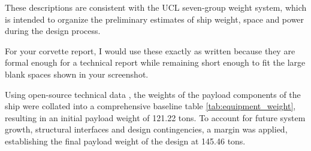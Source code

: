 \documentclass[12pt,a4paper,twoside]{report}
\begin{document}
\begin{enumerate}[\alph*)]
    \vspace{\baselineskip}\par \noindent These descriptions are consistent with the UCL seven-group weight system, which is intended to organize the preliminary estimates of ship weight, space and power during the design process.

   \vspace{\baselineskip}\par \noindent For your corvette report, I would use these exactly as written because they are formal enough for a technical report while remaining short enough to fit the large blank spaces shown in your screenshot.
\end{enumerate}

\vspace{\baselineskip}\par \noindent Using open-source technical data , the weights of the payload components of the ship were collated into a comprehensive baseline table \ref{tab:equipment_weight}, resulting in an initial payload weight of 121.22 tons. To account for future system growth, structural interfaces and design contingencies, a margin was applied, establishing the final payload weight of the design at 145.46 tons.
\end{document}
